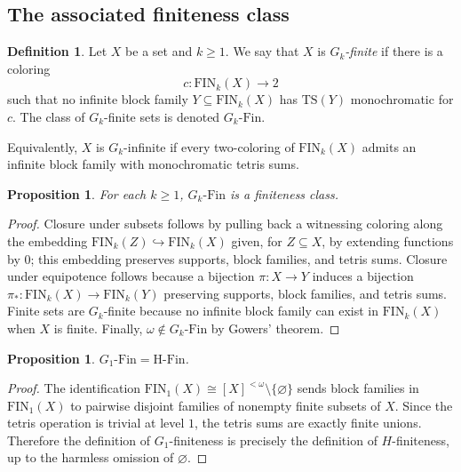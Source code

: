 \documentclass[11pt]{amsart}
\newtheorem{proposition}[theorem]{Proposition}
\theoremstyle{definition}
\newtheorem{definition}[theorem]{Definition}
\newcommand{\Fin}{\mathrm{Fin}}
\newcommand{\HFin}{\mathrm{H\text{-}Fin}}
\newcommand{\FIN}{\mathrm{FIN}}
\newcommand{\TS}{\mathrm{TS}}
\begin{document}
\subsection{The associated finiteness class}

\begin{definition}
Let \(X\) be a set and \(k\geq 1\).  We say that \(X\) is \emph{\(G_k\)-finite} if there is a coloring
\[
    c:\FIN_k(X)\to 2
\]
such that no infinite block family \(Y\subseteq\FIN_k(X)\) has \(\TS(Y)\) monochromatic for \(c\).  The class of \(G_k\)-finite sets is denoted \(G_k\text{-}\Fin\).
\end{definition}

Equivalently, \(X\) is \(G_k\)-infinite if every two-coloring of \(\FIN_k(X)\) admits an infinite block family with monochromatic tetris sums.

\begin{proposition}
For each \(k\geq 1\), \(G_k\text{-}\Fin\) is a finiteness class.
\end{proposition}

\begin{proof}
Closure under subsets follows by pulling back a witnessing coloring along the embedding \(\FIN_k(Z)\hookrightarrow\FIN_k(X)\) given, for \(Z\subseteq X\), by extending functions by \(0\); this embedding preserves supports, block families, and tetris sums.  Closure under equipotence follows because a bijection \(\pi:X\to Y\) induces a bijection \(\pi_*:\FIN_k(X)\to\FIN_k(Y)\) preserving supports, block families, and tetris sums.  Finite sets are \(G_k\)-finite because no infinite block family can exist in \(\FIN_k(X)\) when \(X\) is finite.  Finally, \(\omega\notin G_k\text{-}\Fin\) by Gowers' theorem.
\end{proof}

\begin{proposition}
\(G_1\text{-}\Fin=\HFin\).
\end{proposition}

\begin{proof}
The identification \(\FIN_1(X)\cong [X]^{<\omega}\setminus\{\varnothing\}\) sends block families in \(\FIN_1(X)\) to pairwise disjoint families of nonempty finite subsets of \(X\).  Since the tetris operation is trivial at level \(1\), the tetris sums are exactly finite unions.  Therefore the definition of \(G_1\)-finiteness is precisely the definition of \(H\)-finiteness, up to the harmless omission of \(\varnothing\).
\end{proof}
\end{document}
